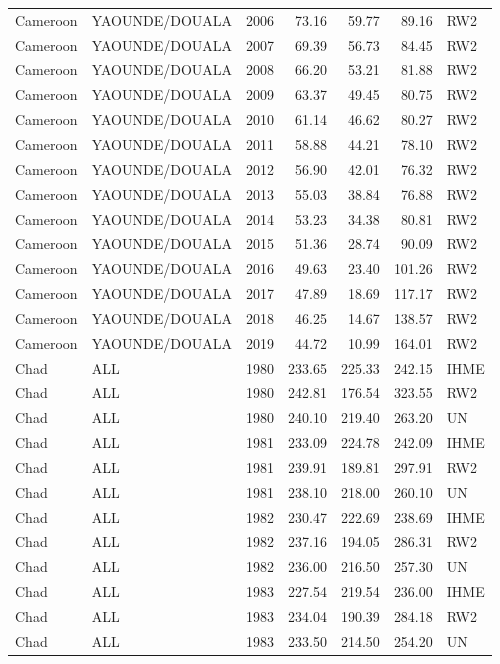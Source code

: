 \begin{longtable}{lllrrrl}
  Cameroon & YAOUNDE/DOUALA & 2006 & 73.16 & 59.77 & 89.16 & RW2 \\ 
  Cameroon & YAOUNDE/DOUALA & 2007 & 69.39 & 56.73 & 84.45 & RW2 \\ 
  Cameroon & YAOUNDE/DOUALA & 2008 & 66.20 & 53.21 & 81.88 & RW2 \\ 
  Cameroon & YAOUNDE/DOUALA & 2009 & 63.37 & 49.45 & 80.75 & RW2 \\ 
  Cameroon & YAOUNDE/DOUALA & 2010 & 61.14 & 46.62 & 80.27 & RW2 \\ 
  Cameroon & YAOUNDE/DOUALA & 2011 & 58.88 & 44.21 & 78.10 & RW2 \\ 
  Cameroon & YAOUNDE/DOUALA & 2012 & 56.90 & 42.01 & 76.32 & RW2 \\ 
  Cameroon & YAOUNDE/DOUALA & 2013 & 55.03 & 38.84 & 76.88 & RW2 \\ 
  Cameroon & YAOUNDE/DOUALA & 2014 & 53.23 & 34.38 & 80.81 & RW2 \\ 
  Cameroon & YAOUNDE/DOUALA & 2015 & 51.36 & 28.74 & 90.09 & RW2 \\ 
  Cameroon & YAOUNDE/DOUALA & 2016 & 49.63 & 23.40 & 101.26 & RW2 \\ 
  Cameroon & YAOUNDE/DOUALA & 2017 & 47.89 & 18.69 & 117.17 & RW2 \\ 
  Cameroon & YAOUNDE/DOUALA & 2018 & 46.25 & 14.67 & 138.57 & RW2 \\ 
  Cameroon & YAOUNDE/DOUALA & 2019 & 44.72 & 10.99 & 164.01 & RW2 \\ 
  Chad & ALL & 1980 & 233.65 & 225.33 & 242.15 & IHME \\ 
  Chad & ALL & 1980 & 242.81 & 176.54 & 323.55 & RW2 \\ 
  Chad & ALL & 1980 & 240.10 & 219.40 & 263.20 & UN \\ 
  Chad & ALL & 1981 & 233.09 & 224.78 & 242.09 & IHME \\ 
  Chad & ALL & 1981 & 239.91 & 189.81 & 297.91 & RW2 \\ 
  Chad & ALL & 1981 & 238.10 & 218.00 & 260.10 & UN \\ 
  Chad & ALL & 1982 & 230.47 & 222.69 & 238.69 & IHME \\ 
  Chad & ALL & 1982 & 237.16 & 194.05 & 286.31 & RW2 \\ 
  Chad & ALL & 1982 & 236.00 & 216.50 & 257.30 & UN \\ 
  Chad & ALL & 1983 & 227.54 & 219.54 & 236.00 & IHME \\ 
  Chad & ALL & 1983 & 234.04 & 190.39 & 284.18 & RW2 \\ 
  Chad & ALL & 1983 & 233.50 & 214.50 & 254.20 & UN \\ 

\end{longtable}
